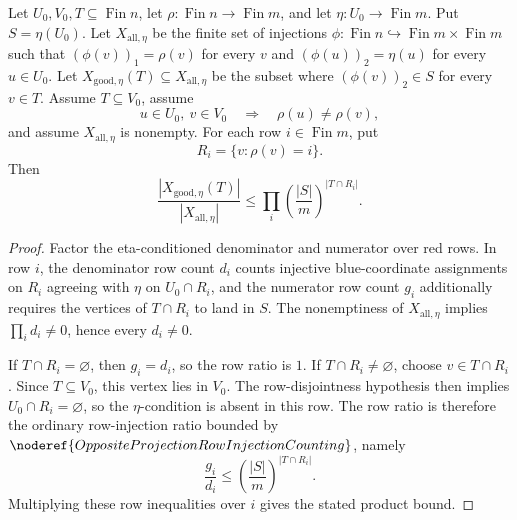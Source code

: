 \begin{helper}
Let \(U_0,V_0,T\subseteq\operatorname{Fin}n\), let
\(\rho:\operatorname{Fin}n\to\operatorname{Fin}m\), and let
\(\eta:U_0\to\operatorname{Fin}m\).  Put \(S=\eta(U_0)\).  Let
\(X_{\mathrm{all},\eta}\) be the finite set of injections
\(\phi:\operatorname{Fin}n\hookrightarrow
\operatorname{Fin}m\times\operatorname{Fin}m\) such that
\((\phi(v))_1=\rho(v)\) for every \(v\) and
\((\phi(u))_2=\eta(u)\) for every \(u\in U_0\).  Let
\(X_{\mathrm{good},\eta}(T)\subseteq X_{\mathrm{all},\eta}\) be the subset
where \((\phi(v))_2\in S\) for every \(v\in T\).  Assume \(T\subseteq V_0\),
assume
\[
u\in U_0,\ v\in V_0\quad\Longrightarrow\quad \rho(u)\ne\rho(v),
\]
and assume \(X_{\mathrm{all},\eta}\) is nonempty.  For each row
\(i\in\operatorname{Fin}m\), put
\[
R_i=\{v:\rho(v)=i\}.
\]
Then
\[
\frac{|X_{\mathrm{good},\eta}(T)|}{|X_{\mathrm{all},\eta}|}
\le
\prod_i
\left(\frac{|S|}{m}\right)^{|T\cap R_i|}.
\]
\end{helper}
\begin{proof}
Factor the eta-conditioned denominator and numerator over red rows.  In row
\(i\), the denominator row count \(d_i\) counts injective blue-coordinate
assignments on \(R_i\) agreeing with \(\eta\) on \(U_0\cap R_i\), and the
numerator row count \(g_i\) additionally requires the vertices of
\(T\cap R_i\) to land in \(S\).  The nonemptiness of
\(X_{\mathrm{all},\eta}\) implies \(\prod_i d_i\ne0\), hence every
\(d_i\ne0\).

If \(T\cap R_i=\varnothing\), then \(g_i=d_i\), so the row ratio is \(1\).
If \(T\cap R_i\ne\varnothing\), choose \(v\in T\cap R_i\).  Since
\(T\subseteq V_0\), this vertex lies in \(V_0\).  The row-disjointness
hypothesis then implies \(U_0\cap R_i=\varnothing\), so the \(\eta\)-condition
is absent in this row.  The row ratio is therefore the ordinary row-injection
ratio bounded by \(\noderef{OppositeProjectionRowInjectionCounting}\), namely
\[
\frac{g_i}{d_i}\le
\left(\frac{|S|}{m}\right)^{|T\cap R_i|}.
\]
Multiplying these row inequalities over \(i\) gives the stated product
bound.
\end{proof}
